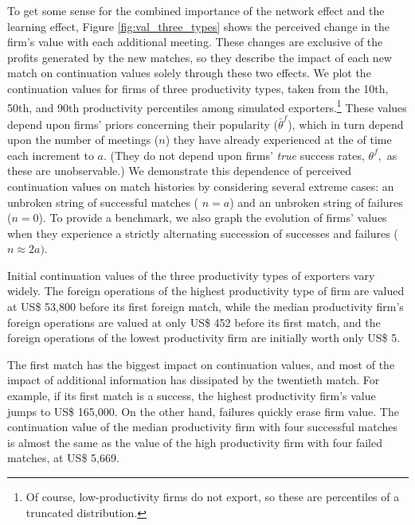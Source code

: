 \documentclass[12pt]{article}
\begin{document}
To get some sense for the combined importance of the network effect and the
learning effect, Figure \ref{fig:val_three_types} shows the perceived change
in the firm's value with each additional meeting. These changes are
exclusive of the profits generated by the new matches, so they describe the
impact of each new match on continuation values solely through these two
effects. We plot the continuation values for firms of three productivity
types, taken from the 10th, 50th, and 90th productivity percentiles among
simulated exporters.\footnote{%
Of course, low-productivity firms do not export, so these are percentiles
of a truncated distribution.} These values depend upon firms' priors
concerning their popularity ($\bar{\theta}^{f}$), which in turn depend upon
the number of meetings ($n$) they have already experienced at the of time
each increment to $a$. (They do not depend upon firms' \textit{true} success
rates, $\theta ^{f},$ as these are unobservable.) We demonstrate this
dependence of perceived continuation values on match histories by
considering several extreme cases: an unbroken string of successful matches (%
$n=a$) and an unbroken string of failures ($n=0$). To provide a benchmark,
we also graph the evolution of firms' values when they experience a strictly
alternating succession of successes and failures ($n\approx 2a)$.

Initial continuation values of the three productivity types of exporters
vary widely. The foreign operations of the highest productivity type of firm
are valued at US\$ 53,800 before its first foreign match, while the median
productivity firm's foreign operations are valued at only US\$ 452 before
its first match, and the foreign operations of the lowest productivity firm
are initially worth only US\$ 5.

The first match has the biggest impact on continuation values, and most of
the impact of additional information has dissipated by the twentieth match.
For example, if its first match is a success, the highest productivity
firm's value jumps to US\$ 165,000. On the other hand, failures quickly
erase firm value. The continuation value of the median productivity firm
with four successful matches is almost the same as the value of the high
productivity firm with four failed matches, at US\$ 5,669.
\end{document}
